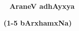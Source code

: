 \thispagestyle{empty}
\begin{center}
~\phantom{a}
\vfill
{\Huge\bfseries AraneV adhAyxya }
\smallskip

{\LARGE\bfseries (1-5 bArxhamxNa)}
\vfill
\eject
\end{center}
